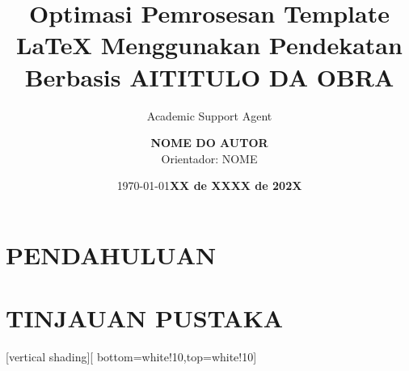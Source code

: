 \documentclass{beamer}
\title{Optimasi Pemrosesan Template LaTeX Menggunakan Pendekatan Berbasis AI}
\author{Academic Support Agent}
\date{\today}
\begin{document}
\maketitle

\begin{abstract}

\end{abstract}

\chapter{PENDAHULUAN}


\chapter{TINJAUAN PUSTAKA}



\usepackage{latexsym}
\usepackage[utf8]{inputenc}
\usepackage[brazil]{babel}
\usepackage{amssymb}
\usepackage{amsmath}
\usepackage{amsfonts}
\usepackage{amsthm} 
\usepackage{newtxmath}
\usepackage{stmaryrd}
\usepackage{fancybox}
\usepackage{datetime}
\usepackage[T1]{fontenc}
\usepackage{graphicx}
\usepackage{graphics}
\usepackage{url}
\usepackage{algorithmic}
\usepackage{algorithm}
\usepackage{acronym}
\usepackage{array}
\usepackage{transparent}       
\usepackage{varioref}
\usepackage{booktabs} 
\usepackage{enumerate}
\usepackage{verbatim} 
\usepackage{multirow}
\usepackage{microtype}         
\usepackage{float}   
\usepackage{hyperref}
\usepackage{array}
\usepackage{subcaption}
\usepackage{tikz}


\newtheorem{definicao}{Definio}
\newcommand{\tab}{\hspace*{2em}}

{
 
  [vertical shading][ bottom=white!10,top=white!10]

}

\title{TITULO DA OBRA} 

\author[NOME DO AUTOR]
{\texorpdfstring{\textbf{NOME DO AUTOR} \\ Orientador: NOME}{Orientador: NOME}}

   
\date{\textbf{XX de XXXX de 202X} }
\end{document}
